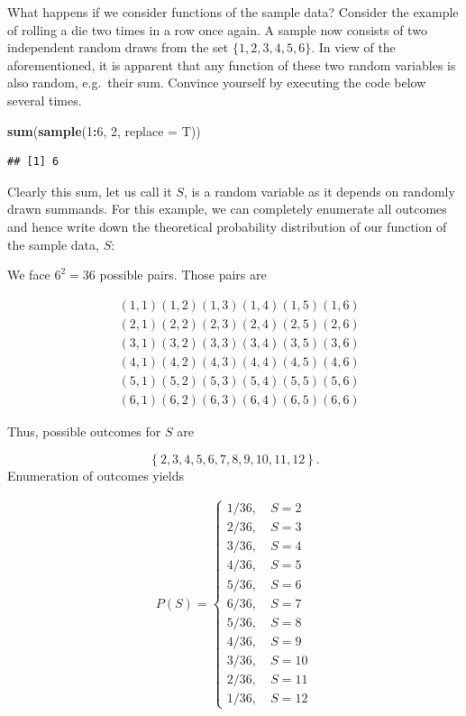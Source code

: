 \documentclass[]{book}
\newenvironment{Shaded}{\begin{snugshade}}{\end{snugshade}}
\newcommand{\KeywordTok}[1]{\textcolor[rgb]{0.13,0.29,0.53}{\textbf{#1}}}
\newcommand{\DataTypeTok}[1]{\textcolor[rgb]{0.13,0.29,0.53}{#1}}
\newcommand{\DecValTok}[1]{\textcolor[rgb]{0.00,0.00,0.81}{#1}}
\newcommand{\OperatorTok}[1]{\textcolor[rgb]{0.81,0.36,0.00}{\textbf{#1}}}
\newcommand{\NormalTok}[1]{#1}
\theoremstyle{definition}
\theoremstyle{definition}
\theoremstyle{definition}
\theoremstyle{remark}
\begin{document}
What happens if we consider functions of the sample data? Consider the
example of rolling a die two times in a row once again. A sample now
consists of two independent random draws from the set
\(\{1,2,3,4,5,6\}\). In view of the aforementioned, it is apparent that
any function of these two random variables is also random, e.g.~their
sum. Convince yourself by executing the code below several times.

\begin{Shaded}
\begin{Highlighting}[]
\KeywordTok{sum}\NormalTok{(}\KeywordTok{sample}\NormalTok{(}\DecValTok{1}\OperatorTok{:}\DecValTok{6}\NormalTok{, }\DecValTok{2}\NormalTok{, }\DataTypeTok{replace =}\NormalTok{ T))}
\end{Highlighting}
\end{Shaded}

\begin{verbatim}
## [1] 6
\end{verbatim}

Clearly this sum, let us call it \(S\), is a random variable as it
depends on randomly drawn summands. For this example, we can completely
enumerate all outcomes and hence write down the theoretical probability
distribution of our function of the sample data, \(S\):

We face \(6^2=36\) possible pairs. Those pairs are

\begin{align}
  &(1,1)    (1,2)   (1,3)   (1,4)   (1,5)   (1,6) \\ 
  &(2,1)    (2,2)   (2,3)   (2,4)   (2,5)   (2,6) \\ 
  &(3,1)    (3,2)   (3,3)   (3,4)   (3,5)   (3,6) \\ 
  &(4,1)    (4,2)   (4,3)   (4,4)   (4,5)   (4,6) \\ 
  &(5,1)    (5,2)   (5,3)   (5,4)   (5,5)   (5,6) \\ 
  &(6,1)    (6,2)   (6,3)   (6,4)   (6,5)   (6,6)
\end{align}

Thus, possible outcomes for \(S\) are

\[ \left\{ 2,3,4,5,6,7,8,9,10,11,12 \right\} . \] Enumeration of
outcomes yields

\begin{align}
  P(S) = 
  \begin{cases} 
    1/36, \ & S = 2 \\ 
    2/36, \ & S = 3 \\
    3/36, \ & S = 4 \\
    4/36, \ & S = 5 \\
    5/36, \ & S = 6 \\
    6/36, \ & S = 7 \\
    5/36, \ & S = 8 \\
    4/36, \ & S = 9 \\
    3/36, \ & S = 10 \\
    2/36, \ & S = 11 \\
    1/36, \ & S = 12
  \end{cases}
\end{align}
\end{document}
